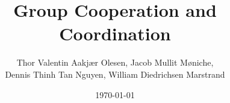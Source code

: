 \documentclass{article}
\date{\today}
\author{Thor Valentin Aakjær Olesen, Jacob Mullit Møniche,\\
 Dennis Thinh Tan Nguyen, William Diedrichsen Marstrand}
\title{Group Cooperation and Coordination}
\begin{document}
\maketitle
\pagebreak



\end{document}
